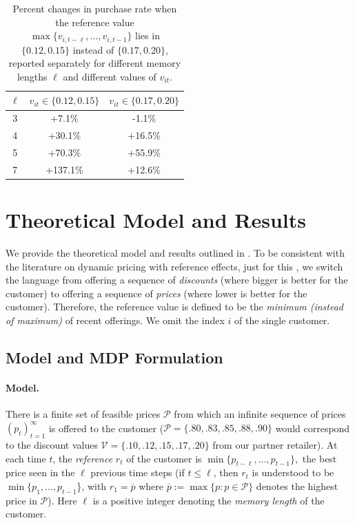 \documentclass[format=acmsmall, review=false]{acmart}
\newcommand{\cP}{\mathcal{P}}
\newcommand{\op}{\overline{p}}
\newcommand{\cV}{\mathcal{V}}
\begin{document}
\begin{table}[]
\centering
\begin{tabular}{c|cc}
\toprule
 $\ell$ &  $v_{it}\in\{0.12,0.15\}$ &  $v_{it}\in\{0.17,0.20\}$ \\
\midrule
 3 &        +7.1\% &        -1.1\%  \\
 4 &        +30.1\%  &         +16.5\%  \\
 5 &        +70.3\%  &         +55.9\%  \\
 7 &       +137.1\%  &        +12.6\%  \\
\bottomrule
\end{tabular}
\caption{Percent changes in purchase rate when the reference value $\max\{v_{i,t-\ell},\ldots,v_{i,t-1}\}$ lies in $\{0.12,0.15\}$ instead of $\{0.17,0.20\}$, reported separately for different memory lengths $\ell$ and different values of $v_{it}$.}
\label{tab:reference-monotonicity}
\end{table}


\section{Theoretical Model and Results} \label{sec:theory}

We provide the theoretical model and results outlined in .
To be consistent with the literature on dynamic pricing with reference effects, just for this , we switch the language from offering a sequence of \textit{discounts} (where bigger is better for the customer) to offering a sequence of \textit{prices} (where lower is better for the customer).  Therefore, the reference value is defined to be the \textit{minimum (instead of maximum)} of recent offerings.
We omit the index $i$ of the single customer.

\subsection{Model and MDP Formulation} \label{sec:model}

\paragraph{Model.}
There is a finite set of feasible prices $\cP$
from which an infinite sequence of prices $(p_t)_{t=1}^\infty$ is offered to the customer ($\cP=\{.80,.83,.85,.88,.90\}$ would correspond to the discount values $\cV=\{.10,.12,.15,.17,.20\}$ from our partner retailer).  At each time $t$, the \textit{reference} $r_t$ of the customer is $\min\{p_{t-\ell},\ldots,p_{t-1}\},$ the best price seen in the $\ell$ previous time steps (if $t\le\ell$, then $r_t$ is understood to be $\min\{p_1,\ldots,p_{t-1}$\}, with $r_1=\op$ where $\op:=\max\{p:p\in\cP\}$ denotes the highest price in $\cP$).
Here $\ell$ is a positive integer denoting the \textit{memory length} of the customer.
\end{document}
